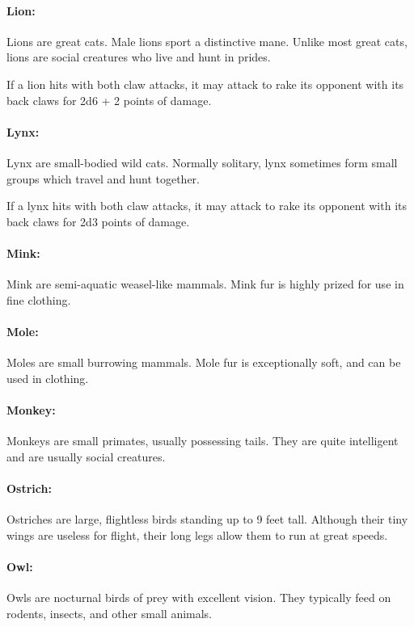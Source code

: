\begin{multicols}{2}

\paragraph{Lion:} Lions are great cats. Male lions sport a distinctive mane. Unlike most great cats, lions are social creatures who live and hunt in prides.

If a lion hits with both claw attacks, it may attack to rake its opponent with its back claws for 2d6 + 2 points of damage.

\paragraph{Lynx:} Lynx are small-bodied wild cats. Normally solitary, lynx sometimes form small groups which travel and hunt together.

If a lynx hits with both claw attacks, it may attack to rake its opponent with its back claws for 2d3 points of damage.

\paragraph{Mink:} Mink are semi-aquatic weasel-like mammals. Mink fur is highly prized for use in fine clothing.

\paragraph{Mole:} Moles are small burrowing mammals. Mole fur is exceptionally soft, and can be used in clothing.

\paragraph{Monkey:} Monkeys are small primates, usually possessing tails. They are quite intelligent and are usually social creatures.

\paragraph{Ostrich:} Ostriches are large, flightless birds standing up to 9 feet tall. Although their tiny wings are useless for flight, their long legs allow them to run at great speeds.

\paragraph{Owl:} Owls are nocturnal birds of prey with excellent vision. They typically feed on rodents, insects, and other small animals.


\end{multicols}
